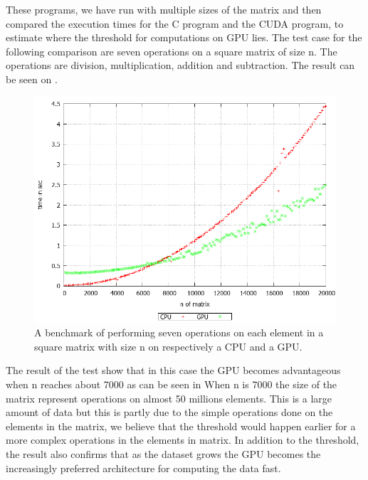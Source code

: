 These programs, we have run with multiple sizes of the matrix and then compared the execution times for the C program and the CUDA program, to estimate where the threshold for computations on GPU lies.
The test case for the following comparison are seven operations on a square matrix of size n.
The operations are division, multiplication, addition and subtraction.
The result can be seen on .
\begin{figure}[h!]
\centering
 \includegraphics[width=1\textwidth]{figures/benchmark.png} %
\caption{A benchmark of performing seven operations on each element in a square matrix with size n on respectively a CPU and a GPU.}\label{image:benchmark}
\vspace{-15pt}
\end{figure}

The result of the test show that in this case the GPU becomes advantageous when n reaches about 7000 as can be seen in 
When n is 7000 the size of the matrix represent operations on almost 50 millions elements.
This is a large amount of data but this is partly due to the simple operations done on the elements in the matrix, we believe that the threshold would happen earlier for a more complex operations in the elements in matrix.
In addition to the threshold, the result also confirms that as the dataset grows the GPU becomes the increasingly preferred architecture for computing the data fast.
